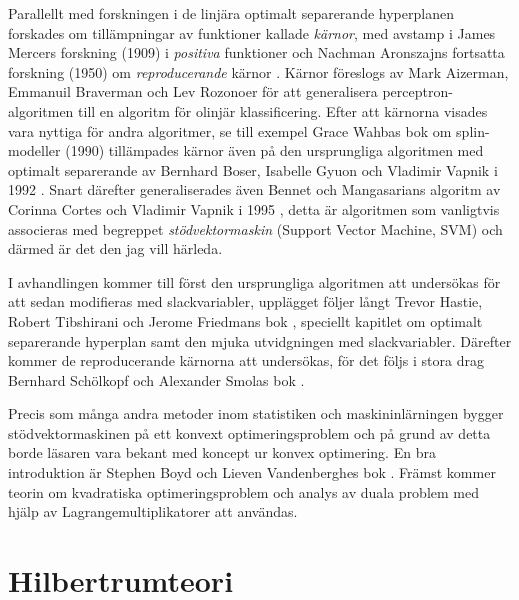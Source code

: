 \documentclass[a4paper, 12pt]{report}
\theoremstyle{definition}
\theoremstyle{remark}
\begin{document}
Parallellt med forskningen i de linjära optimalt separerande hyperplanen forskades om tillämpningar av funktioner kallade \emph{kärnor}, med avstamp i James Mercers forskning (1909) i \emph{positiva} funktioner \cite{Mercer} och Nachman Aronszajns fortsatta forskning (1950) om \emph{reproducerande} kärnor \cite{Aronszajn}.
Kärnor föreslogs av Mark Aizerman, Emmanuil Braverman och Lev Rozonoer \cite{Aizerman} för att generalisera perceptron-algoritmen till en algoritm för olinjär klassificering.
Efter att kärnorna visades vara nyttiga för andra algoritmer, se till exempel Grace Wahbas bok om splin-modeller (1990) \cite{Grace} tillämpades kärnor även på den ursprungliga algoritmen med optimalt separerande av Bernhard Boser, Isabelle Gyuon och Vladimir Vapnik i 1992 \cite{BoserGyuonVapnik}.
Snart därefter generaliserades även Bennet och Mangasarians algoritm av Corinna Cortes och Vladimir Vapnik i 1995 \cite{CortesVapnik}, detta är algoritmen som vanligtvis associeras med begreppet \emph{stödvektormaskin} (Support Vector Machine, SVM) och därmed är det den jag vill härleda.

I avhandlingen kommer till först den ursprungliga algoritmen att undersökas för att sedan modifieras med slackvariabler, upplägget följer långt Trevor Hastie, Robert Tibshirani och Jerome Friedmans bok \cite{ESL}, speciellt kapitlet om optimalt separerande hyperplan samt den mjuka utvidgningen med slackvariabler.
Därefter kommer de reproducerande kärnorna att undersökas, för det följs i stora drag Bernhard Schölkopf och Alexander Smolas bok \cite{LearningKernels}.

Precis som många andra metoder inom statistiken och maskininlärningen bygger stödvektormaskinen på ett konvext optimeringsproblem och på grund av detta borde läsaren vara bekant med koncept ur konvex optimering.
En bra introduktion är Stephen Boyd och Lieven Vandenberghes bok \cite{Boyd}.
Främst kommer teorin om kvadratiska optimeringsproblem och analys av duala problem med hjälp av Lagrangemultiplikatorer att användas.


\chapter{Hilbertrumteori}\label{chap:hilbert}
\end{document}
